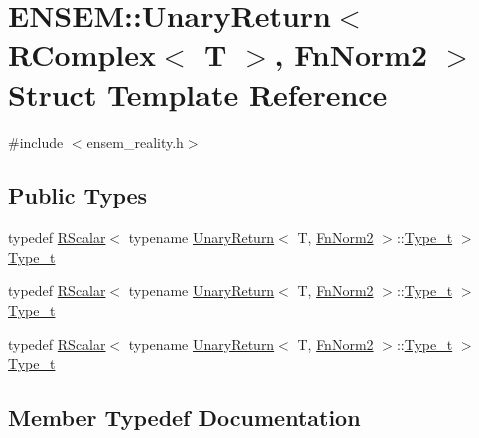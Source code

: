 \hypertarget{structENSEM_1_1UnaryReturn_3_01RComplex_3_01T_01_4_00_01FnNorm2_01_4}{}\section{E\+N\+S\+EM\+:\+:Unary\+Return$<$ R\+Complex$<$ T $>$, Fn\+Norm2 $>$ Struct Template Reference}
\label{structENSEM_1_1UnaryReturn_3_01RComplex_3_01T_01_4_00_01FnNorm2_01_4}


{\ttfamily \#include $<$ensem\+\_\+reality.\+h$>$}

\subsection*{Public Types}
\begin{DoxyCompactItemize}
\item 
typedef \mbox{\hyperlink{classENSEM_1_1RScalar}{R\+Scalar}}$<$ typename \mbox{\hyperlink{structENSEM_1_1UnaryReturn}{Unary\+Return}}$<$ T, \mbox{\hyperlink{structENSEM_1_1FnNorm2}{Fn\+Norm2}} $>$\+::\mbox{\hyperlink{structENSEM_1_1UnaryReturn_3_01RComplex_3_01T_01_4_00_01FnNorm2_01_4_a6b6070508bed1e14a03db04ab901526a}{Type\+\_\+t}} $>$ \mbox{\hyperlink{structENSEM_1_1UnaryReturn_3_01RComplex_3_01T_01_4_00_01FnNorm2_01_4_a6b6070508bed1e14a03db04ab901526a}{Type\+\_\+t}}
\item 
typedef \mbox{\hyperlink{classENSEM_1_1RScalar}{R\+Scalar}}$<$ typename \mbox{\hyperlink{structENSEM_1_1UnaryReturn}{Unary\+Return}}$<$ T, \mbox{\hyperlink{structENSEM_1_1FnNorm2}{Fn\+Norm2}} $>$\+::\mbox{\hyperlink{structENSEM_1_1UnaryReturn_3_01RComplex_3_01T_01_4_00_01FnNorm2_01_4_a6b6070508bed1e14a03db04ab901526a}{Type\+\_\+t}} $>$ \mbox{\hyperlink{structENSEM_1_1UnaryReturn_3_01RComplex_3_01T_01_4_00_01FnNorm2_01_4_a6b6070508bed1e14a03db04ab901526a}{Type\+\_\+t}}
\item 
typedef \mbox{\hyperlink{classENSEM_1_1RScalar}{R\+Scalar}}$<$ typename \mbox{\hyperlink{structENSEM_1_1UnaryReturn}{Unary\+Return}}$<$ T, \mbox{\hyperlink{structENSEM_1_1FnNorm2}{Fn\+Norm2}} $>$\+::\mbox{\hyperlink{structENSEM_1_1UnaryReturn_3_01RComplex_3_01T_01_4_00_01FnNorm2_01_4_a6b6070508bed1e14a03db04ab901526a}{Type\+\_\+t}} $>$ \mbox{\hyperlink{structENSEM_1_1UnaryReturn_3_01RComplex_3_01T_01_4_00_01FnNorm2_01_4_a6b6070508bed1e14a03db04ab901526a}{Type\+\_\+t}}
\end{DoxyCompactItemize}


\subsection{Member Typedef Documentation}
\mbox{\label{structENSEM_1_1UnaryReturn_3_01RComplex_3_01T_01_4_00_01FnNorm2_01_4_a6b6070508bed1e14a03db04ab901526a}} 
